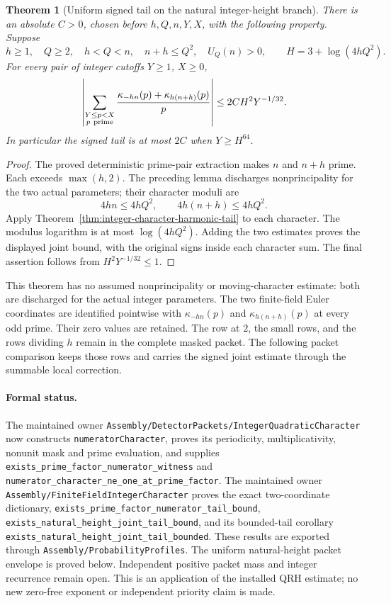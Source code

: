 \documentclass[11pt]{article}
\newtheorem{theorem}{Theorem}[section]
\begin{document}
\begin{theorem}[Uniform signed tail on the natural integer-height branch]
\label{thm:integer-character-natural-height}
There is an absolute \(C>0\), chosen before \(h,Q,n,Y,X\), with the
following property. Suppose
\[
 h\geq1,\quad Q\geq2,\quad h<Q<n,\quad n+h\leq Q^2,\quad U_Q(n)>0,
 \qquad H=3+\log(4hQ^2).
\]
For every pair of integer cutoffs \(Y\geq1\), \(X\geq0\),
\[
 \left|\sum_{\substack{Y\leq p<X\\p\ {\rm prime}}}
       \frac{\kappa_{-hn}(p)+\kappa_{h(n+h)}(p)}p\right|
       \leq 2CH^2Y^{-1/32}.
\]
In particular the signed tail is at most \(2C\) when \(Y\geq H^{64}\).
\end{theorem}
\begin{proof}
The proved deterministic prime-pair extraction makes \(n\) and \(n+h\)
prime. Each exceeds \(\max(h,2)\). The preceding lemma discharges
nonprincipality for the two actual parameters; their character moduli are
\[
                     4hn\leq4hQ^2,\qquad4h(n+h)\leq4hQ^2.
\]
Apply Theorem~\ref{thm:integer-character-harmonic-tail} to each character.
The modulus logarithm is at most \(\log(4hQ^2)\).
Adding the two estimates proves the displayed joint bound, with the
original signs inside each character sum. The final assertion follows
from \(H^2Y^{-1/32}\leq1\).
\end{proof}

This theorem has no assumed nonprincipality or moving-character estimate:
both are discharged for the actual integer parameters.
The two finite-field Euler coordinates are identified pointwise with
\(\kappa_{-hn}(p)\) and \(\kappa_{h(n+h)}(p)\) at every odd prime.
Their zero values are retained. The row at \(2\), the small rows, and
the rows dividing \(h\) remain in the complete masked packet.
The following packet comparison keeps those rows and carries the signed
joint estimate through the summable local correction.

\paragraph{Formal status.}
The maintained owner \texttt{Assembly/DetectorPackets/IntegerQuadraticCharacter}
now constructs \texttt{numeratorCharacter}, proves its periodicity,
multiplicativity, nonunit mask and prime evaluation, and supplies
\texttt{exists\_prime\_factor\_numerator\_witness} and
\texttt{numerator\_character\_ne\_one\_at\_prime\_factor}.
The maintained owner \texttt{Assembly/FiniteFieldIntegerCharacter}
proves the exact two-coordinate dictionary,
\texttt{exists\_prime\_factor\_numerator\_tail\_bound},
\texttt{exists\_natural\_height\_joint\_tail\_bound}, and its bounded-tail
corollary \texttt{exists\_natural\_height\_joint\_tail\_bounded}.
These results are exported through \texttt{Assembly/ProbabilityProfiles}.
The uniform natural-height packet envelope is proved below. Independent
positive packet mass and integer recurrence remain open. This is an application of the installed QRH
estimate; no new zero-free exponent or independent priority claim is made.
\end{document}
